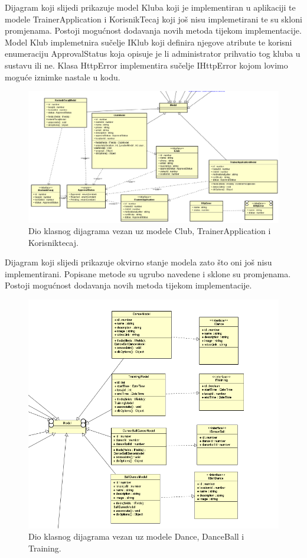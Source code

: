 			Dijagram koji slijedi prikazuje model Kluba koji je implementiran u aplikaciji te modele TrainerApplication i KorisnikTecaj
			koji još nisu implemetirani te su skloni promjenama. Postoji mogućnost dodavanja novih metoda tijekom implementacije.
			Model Klub implemetnira sučelje IKlub koji definira njegove atribute te korisni enumeraciju ApprovalStatus koja opisuje je li 
			administrator prihvatio tog kluba u sustavu ili ne. Klasa HttpError implementira sučelje IHttpError kojom lovimo moguće iznimke 
			nastale u kodu.\\
			\begin{figure}[H]
				\includegraphics[scale=0.7]{slike/class2.png}
				\centering
				\caption{Dio klasnog dijagrama vezan uz modele Club, TrainerApplication i Korisniktecaj.}
				\label{fig:class1}
			\end{figure}

			Dijagram koji slijedi prikazuje okvirno stanje modela zato što oni još nisu implementirani. Popisane metode su 
			ugrubo navedene i sklone su promjenama. Postoji mogućnost dodavanja novih metoda tijekom implementacije.\\
			\begin{figure}[H]
				\includegraphics[scale=1.0]{slike/class3.png}
				\centering
				\caption{Dio klasnog dijagrama vezan uz modele Dance, DanceBall i Training.}
				\label{fig:class1}
			\end{figure}

